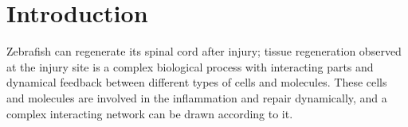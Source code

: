 \chapter{Introduction}







Zebrafish can regenerate its spinal cord after injury; tissue regeneration observed at the injury site is a complex biological process with interacting parts and dynamical feedback between different types of cells and molecules. These cells and molecules are involved in the inflammation and repair dynamically, and a complex interacting network can be drawn according to it.





